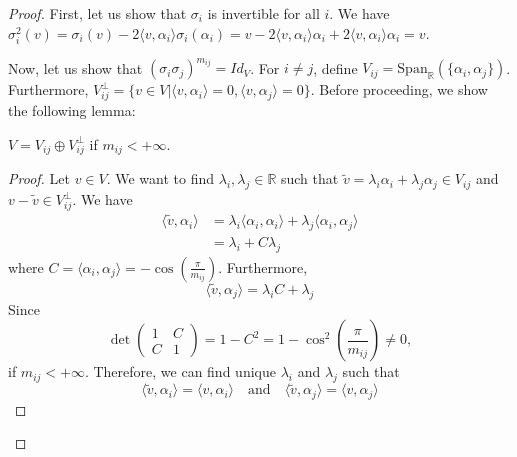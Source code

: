 \documentclass[envcountsame,envcountchap]{svmono}
\begin{document}
\begin{proof}
First, let us show that $\sigma_i$ is invertible for all $i$. We have $\sigma^2_i (v) = \sigma_i (v) - 2 \langle v, \alpha_i \rangle \sigma_i (\alpha_i) = v - 2  \langle v, \alpha_i \rangle \alpha_i + 2  \langle v, \alpha_i \rangle \alpha_i = v$. 

Now, let us show that $(\sigma_i \sigma_j)^{m_{ij}} = Id_V$. For $i\neq j$, define $V_{ij} = \text{Span}_\mathbb{R} ( \{ \alpha_i , \alpha_j \} )$. Furthermore, $V_{ij}^\perp = \{ v\in V | \langle v, \alpha_i \rangle = 0, \langle v, \alpha_j \rangle = 0 \}$. Before proceeding, we show the following lemma:

\begin{lemma}
$V = V_{ij} \oplus V_{ij}^\perp$ if $m_{ij} < + \infty$. 
\end{lemma}
 
\begin{proof}
Let $v \in V$. We want to find $\lambda_i, \lambda_j \in \mathbb{R}$ such that $\tilde{v} = \lambda_i \alpha_i + \lambda_j \alpha_j \in V_{ij}$ and $v - \tilde{v} \in V_{ij}^\perp$. We have
\begin{equation}
\begin{split}
\langle \tilde{v}, \alpha_i \rangle &= \lambda_i \langle \alpha_i , \alpha_i \rangle + \lambda_j \langle \alpha_i, \alpha_j \rangle \\
&= \lambda_i + C \lambda_j
\end{split}
\end{equation} where $C = \langle \alpha_i, \alpha_j \rangle = - \cos \left( \frac{\pi}{m_{ij}} \right)$. Furthermore,
\begin{equation}
\langle \tilde{v}, \alpha_j \rangle = \lambda_i C + \lambda_j
\end{equation} Since 
\begin{equation}
\det \begin{pmatrix}
1 & C \\
C & 1 
\end{pmatrix} = 1 - C^2 = 1 - \cos^2 \left( \frac{\pi}{m_{ij}} \right) \neq 0, 
\end{equation} if $m_{ij} < + \infty$. Therefore, we can find unique $\lambda_i$ and $\lambda_j$ such that
\begin{equation}
\langle \tilde{v} , \alpha_i \rangle = \langle v, \alpha_i \rangle \quad \text{and} \quad \langle \tilde{v} , \alpha_j \rangle = \langle v, \alpha_j \rangle  
\end{equation} 
\end{proof} 


\end{proof}
\end{document}
